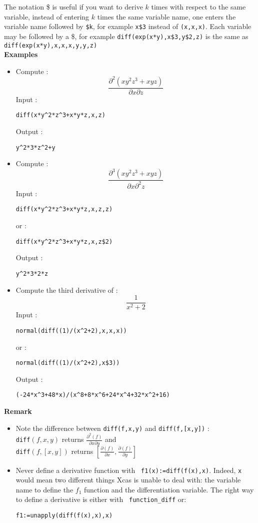 \documentclass[a4paper,11pt]{book}
\begin{document}
The notation \$ is useful if you want to derive $k$ times with
respect to the same variable, instead of entering $k$ times the
same variable name, one enters the variable name followed by {\tt \$k},
for example {\tt x\$3} instead of {\tt(x,x,x)}. 
Each variable may be followed by a \$, for example 
{\tt diff(exp(x*y),x\$3,y\$2,z)} is the same as 
{\tt diff(exp(x*y),x,x,x,y,y,z)}\\
{\bf Examples}
\begin{itemize}
\item Compute :
$$\frac {\partial^2 (x y^2 z^3+x y z)}{\partial x\partial z}$$
Input :
\begin{center}{\tt diff(x*y\verb|^|2*z\verb|^|3+x*y*z,x,z)}\end{center}
Output  :
\begin{center}{\tt y\verb|^|2*3*z\verb|^|2+y}\end{center}
\item Compute :
$$\frac {\partial^3 (x y^2 z^3+x y z)}{\partial x\partial^2 z}$$
Input :
\begin{center}{\tt  diff(x*y\verb|^|2*z\verb|^|3+x*y*z,x,z,z)}\end{center}
or :
\begin{center}{\tt  diff(x*y\verb|^|2*z\verb|^|3+x*y*z,x,z\$2)}\end{center}
Output  :
\begin{center}{\tt y\verb|^|2*3*2*z}\end{center}
\item Compute the third derivative of :
$$\frac{1}{x^2+2}$$
Input :
\begin{center}{\tt  normal(diff((1)/(x\verb|^|2+2),x,x,x))}\end{center}
or :
\begin{center}{\tt  normal(diff((1)/(x\verb|^|2+2),x\$3))}\end{center}
Output  :
\begin{center}{\tt (-24*x\verb|^|3+48*x)/(x\verb|^|8+8*x\verb|^|6+24*x\verb|^|4+32*x\verb|^|2+16)}\end{center}
\end{itemize}
{\bf Remark}
\begin{itemize}
\item 
Note the difference between {\tt diff(f,x,y)} and {\tt  diff(f,[x,y])} :\\
{\tt diff}$(f,x,y)$ returns $\displaystyle \frac{\partial^2(f)}{\partial x\partial y}$ and\\
{\tt diff}$(f,[x,y])$ returns
$\displaystyle[\frac{\partial(f)}{\partial x},\frac{\partial
  (f)}{\partial y}]$ 
\item Never define a derivative function with {\tt
    f1(x):=diff(f(x),x)}.
Indeed, {\tt x} would mean two different things Xcas is unable to
deal with: the variable name to
define the $f_1$ function and the differentiation variable.
The right way to define a derivative is either with {\tt
  function\_diff} or:
\begin{center}
{\tt f1:=unapply(diff(f(x),x),x)}
\end{center}
\end{itemize}
\end{document}
